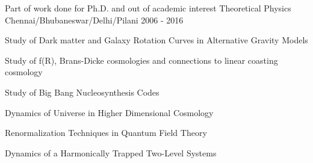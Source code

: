 \begin{cventries}
  \cventry
    {Part of work done for Ph.D. and out of academic interest} %
    {Theoretical Physics} %
    {Chennai/Bhubaneswar/Delhi/Pilani} %
    {2006 - 2016} %
    {
      \begin{cvitems} %
	\item {Study of Dark matter and Galaxy Rotation Curves in Alternative Gravity Models}
	\item {Study of f(R), Brans-Dicke cosmologies and connections to linear coasting cosmology}
	\item {Study of Big Bang Nucleosynthesis Codes}
	\item {Dynamics of Universe in Higher Dimensional Cosmology}
        \item {Renormalization Techniques in Quantum Field Theory}
        \item {Dynamics of a Harmonically Trapped Two-Level Systems}
      \end{cvitems}
    }

\end{cventries}

